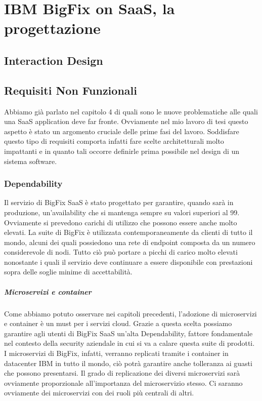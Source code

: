 \chapter{IBM BigFix on SaaS, la progettazione}

\section{Interaction Design}

\section{Requisiti Non Funzionali}
Abbiamo già parlato nel capitolo 4 di quali sono le nuove problematiche alle quali una SaaS application deve far fronte. Ovviamente nel mio lavoro di tesi questo aspetto è stato un argomento cruciale delle prime fasi del lavoro. Soddisfare questo tipo di requisiti comporta infatti fare scelte architetturali molto impattanti e in quanto tali occorre definirle prima possibile nel design di un sistema software. 

\subsection{Dependability}
Il servizio di BigFix SaaS è stato progettato per garantire, quando sarà in produzione, un'availability che si mantenga sempre su valori superiori al 99. Ovviamente si prevedono carichi di utilizzo che possono essere anche molto elevati. La suite di BigFix è utilizzata contemporaneamente da clienti di tutto il mondo, alcuni dei quali possiedono una rete di endpoint composta da un numero considerevole di nodi. Tutto ciò può portare a picchi di carico molto elevati nonostante i quali il servizio deve continuare a essere disponibile con prestazioni sopra delle soglie minime di accettabilità.

\paragraph{Microservizi e container}
Come abbiamo potuto osservare nei capitoli precedenti, l'adozione di microservizi e container è un must per i servizi cloud. Grazie a questa scelta possiamo garantire agli utenti di BigFix SaaS un'alta Dependability, fattore fondamentale nel contesto della security aziendale in cui si va a calare questa suite di prodotti. I microservizi di BigFix, infatti, verranno replicati tramite i container in datacenter IBM in tutto il mondo, ciò potrà garantire anche tolleranza ai guasti che possono presentarsi. Il grado di replicazione dei diversi microservizi sarà ovviamente proporzionale all'importanza del microservizio stesso. Ci saranno ovviamente dei microservizi con dei ruoli più centrali di altri.

